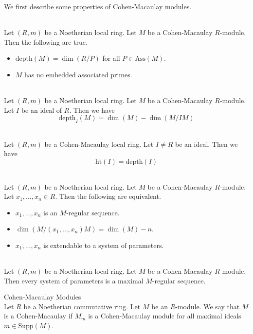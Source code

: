 \documentclass[a4paper]{article}
\begin{document}
We first describe some properties of Cohen-Macaulay modules. 

\begin{prp}{}{}\\
Let $(R,m)$ be a Noetherian local ring. Let $M$ be a Cohen-Macaulay $R$-module. Then the following are true. 
\begin{itemize}
\item $\text{depth}(M)=\dim(R/P)$ for all $P\in\text{Ass}(M)$. 
\item $M$ has no embedded associated primes. 
\end{itemize}
\end{prp}

\begin{prp}{}{}\\
Let $(R,m)$ be a Noetherian local ring. Let $M$ be a Cohen-Macaulay $R$-module. Let $I$ be an ideal of $R$. Then we have $$\text{depth}_I(M)=\dim(M)-\dim(M/IM)$$
\end{prp}

\begin{crl}{}{}\\
Let $(R,m)$ be a Cohen-Macaulay local ring. Let $I\neq R$ be an ideal. Then we have $$\text{ht}(I)=\text{depth}(I)$$
\end{crl}

\begin{prp}{}{}\\
Let $(R,m)$ be a Noetherian local ring. Let $M$ be a Cohen-Macaulay $R$-module. Let $x_1,\dots,x_n\in R$. Then the following are equivalent. 
\begin{itemize}
\item $x_1,\dots,x_n$ is an $M$-regular sequence. 
\item $\dim(M/(x_1,\dots,x_n)M)=\dim(M)-n$. 
\item $x_1,\dots,x_n$ is extendable to a system of parameters. 
\end{itemize}
\end{prp}

\begin{crl}{}{}\\
Let $(R,m)$ be a Noetherian local ring. Let $M$ be a Cohen-Macaulay $R$-module. Then every system of parameters is a maximal $M$-regular sequence. 
\end{crl}

\begin{defn}{Cohen-Macaulay Modules}{}\\
Let $R$ be a Noetherian commutative ring. Let $M$ be an $R$-module. We say that $M$ is a Cohen-Macaulay if $M_m$ is a Cohen-Macaulay module for all maximal ideals $m\in\text{Supp}(M)$. 
\end{defn}
\end{document}
